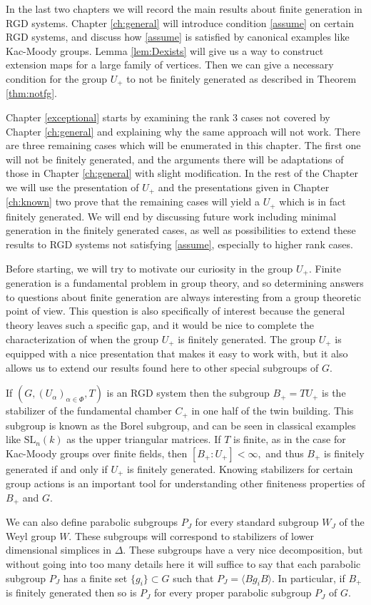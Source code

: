 \documentclass[class=book, crop=false,12 pt]{standalone}
\begin{document}
In the last two chapters we will record the main results about finite generation in RGD systems. Chapter \ref{ch:general} will introduce condition \eqref{assume} on certain RGD systems, and discuss how \eqref{assume} is satisfied by canonical examples like Kac-Moody groups. Lemma \ref{lem:Dexists} will give us a way to construct extension maps for a large family of vertices. Then we can give a necessary condition for the group $U_+$ to not be finitely generated as described in Theorem \ref{thm:notfg}.

Chapter \ref{exceptional} starts by examining the rank 3 cases not covered by Chapter \ref{ch:general} and explaining why the same approach will not work. There are three remaining cases which will be enumerated in this chapter. The first one will not be finitely generated, and the arguments there will be adaptations of those in Chapter \ref{ch:general} with slight modification. In the rest of the Chapter we will use the presentation of $U_+$ and the presentations given in Chapter \ref{ch:known} two prove that the remaining cases will yield a $U_+$ which is in fact finitely generated. We will end by discussing future work including minimal generation in the finitely generated cases, as well as possibilities to extend these results to RGD systems not satisfying \eqref{assume}, especially to higher rank cases.

Before starting, we will try to motivate our curiosity in the group $U_+.$ Finite generation is a fundamental problem in group theory, and so determining answers to questions about finite generation are always interesting from a group theoretic point of view. This question is also specifically of interest because the general theory leaves such a specific gap, and it would be nice to complete the characterization of when the group $U_+$ is finitely generated. The group $U_+$ is equipped with a nice presentation that makes it easy to work with, but it also allows us to extend our results found here to other special subgroups of $G.$

If $(G,(U_\alpha)_{\alpha\in \Phi},T)$ is an RGD system then the subgroup $B_+=TU_+$ is the stabilizer of the fundamental chamber $C_+$ in one half of the twin building. This subgroup is known as the Borel subgroup, and can be seen in classical examples like $\mathrm{SL}_n(k)$ as the upper triangular matrices. If $T$ is finite, as in the case for Kac-Moody groups over finite fields, then $[B_+:U_+]<\infty,$ and thus $B_+$ is finitely generated if and only if $U_+$ is finitely generated. Knowing stabilizers for certain group actions is an important tool for understanding other finiteness properties of $B_+$ and $G.$ 

We can also define parabolic subgroups $P_J$ for every standard subgroup $W_J$ of the Weyl group $W.$ These subgroups will correspond to stabilizers of lower dimensional simplices in $\Delta.$ These subgroups have a very nice decomposition, but without going into too many details here it will suffice to say that each parabolic subgroup $P_J$ has a finite set $\{g_i\}\subset G$ such that $P_J=\langle Bg_iB\rangle.$ In particular, if $B_+$ is finitely generated then so is $P_J$ for every proper parabolic subgroup $P_J$ of $G.$ 
\end{document}
